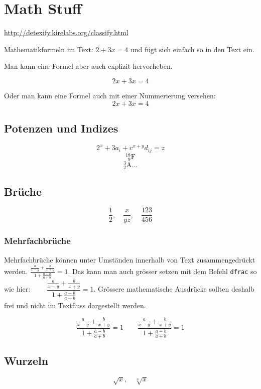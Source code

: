 \documentclass[10pt]{article}
\numberwithin{equation}{section}
\numberwithin{figure}{section}
\begin{document}
\section{Math Stuff}

\url{http://detexify.kirelabs.org/classify.html}

Mathematikformeln im Text: \( 2 + 3x = 4\) und fügt sich einfach so in den Text ein.

Man kann eine Formel aber auch explizit hervorheben.

\[ 2x + 3x = 4 \]

Oder man kann eine Formel auch mit einer Nummerierung versehen:
\begin{equation}
2x + 3x = 4
\end{equation}

\subsection{Potenzen und Indizes}

\[ 2^x + 3a_i + c^{x+y}d_{ij} = z  \]
\[{}^{18}_{\phantom{1}9}\mathrm{F}\]
\[ {}^3_2\mathrm{A} \ldots \]


\subsection{Brüche}

\[\frac{1}{2}, \quad \frac{x}{yz},\quad \frac{123}{456}\]

\subsubsection{Mehrfachbrüche}

Mehrfachbrüche können unter Umständen innerhalb von Text zusammengedrückt werden. \( \frac{\frac{a}{x-y}+\frac{b}{x+y}}{1+\frac{a-b}{a+b}} = 1. \) Das kann man auch gr\"osser setzen mit dem Befehl \texttt{dfrac} so wie hier: \( \qquad \dfrac{\frac{a}{x-y}+\frac{b}{x+y}}{1+\frac{a-b}{a+b}} = 1 \). Grössere mathematische Ausdrücke sollten deshalb frei und nicht im Textfluss dargestellt werden.

\[\frac{\frac{a}{x-y}+\frac{b}{x+y}}{1+\frac{a-b}{a+b}} = 1 \qquad \dfrac{\frac{a}{x-y}+\frac{b}{x+y}}{1+\frac{a-b}{a+b}} = 1 \]

\subsection{Wurzeln}

\[ \sqrt{x},\quad \sqrt[n]{x}  \]
\end{document}
